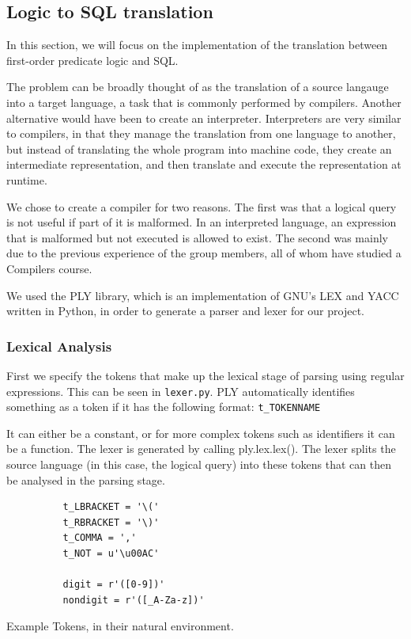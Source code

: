 \documentclass[a4paper, 11pt]{article}
\begin{document}
    \subsection{Logic to SQL translation}
      In this section, we will focus on the implementation of the translation
      between first-order predicate logic and SQL.

      The problem can be broadly thought of as the translation of a source
      langauge into a target language, a task that is commonly performed by
      compilers. Another alternative would have been to create an interpreter.
      Interpreters are very similar to compilers, in that they manage the
      translation from one language to another, but instead of translating the
      whole program into machine code, they create an intermediate
      representation, and then translate and execute the representation at
      runtime.

      We chose to create a compiler for two reasons. The first was that a
      logical query is not useful if part of it is malformed. In an interpreted
      language, an expression that is malformed but not executed is allowed to
      exist. The second was mainly due to the previous experience of the group
      members, all of whom have studied a Compilers course.

      We used the PLY library, which is an implementation of GNU's LEX and YACC
      written in Python, in order to generate a parser and lexer for our
      project.
    \subsubsection{Lexical Analysis}

      First we specify the tokens that make up the lexical stage of parsing
      using regular expressions. This can be seen in
      \texttt{lexer.py}. PLY automatically identifies something as a token if it
      has the following format: \texttt{t\_TOKENNAME}

      It can either be a constant, or for more complex tokens such as
      identifiers it can be a function.
      The lexer is generated by calling ply.lex.lex(). The lexer splits the
      source language (in this case, the logical query) into these tokens that
      can then be analysed in the parsing stage.
  
      \begin{center}
        \begin{verbatim}
          t_LBRACKET = '\('
          t_RBRACKET = '\)'
          t_COMMA = ','
          t_NOT = u'\u00AC'

          digit = r'([0-9])'
          nondigit = r'([_A-Za-z])'
        \end{verbatim}
        Example Tokens, in their natural environment. 
      \end{center}
\end{document}
